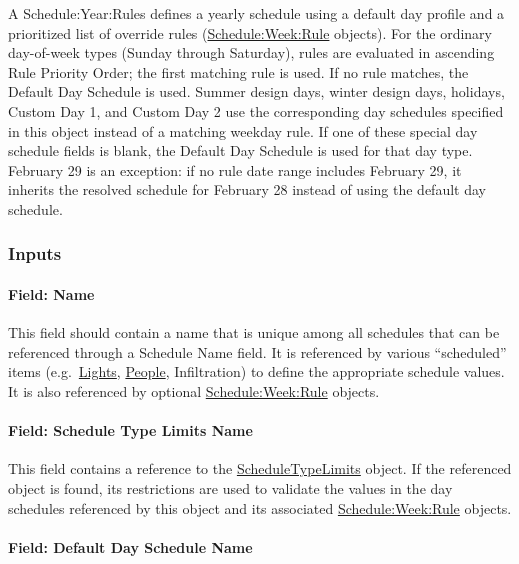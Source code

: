 A Schedule:Year:Rules defines a yearly schedule using a default day profile and a prioritized list of override rules (\hyperref[scheduleweekrule]{Schedule:Week:Rule} objects).
For the ordinary day-of-week types (Sunday through Saturday), rules are evaluated in ascending Rule Priority Order; the first matching rule is used.
If no rule matches, the Default Day Schedule is used.
Summer design days, winter design days, holidays, Custom Day 1, and Custom Day 2 use the corresponding day schedules specified in this object instead of a matching weekday rule.
If one of these special day schedule fields is blank, the Default Day Schedule is used for that day type.
February 29 is an exception: if no rule date range includes February 29, it inherits the resolved schedule for February 28 instead of using the default day schedule.

\subsubsection{Inputs}\label{inputs-scheduleyearrules}

\paragraph{Field: Name}\label{field-name-scheduleyearrules}

This field should contain a name that is unique among all schedules that can be referenced through a Schedule Name field.
It is referenced by various ``scheduled'' items (e.g.~\hyperref[lights-000]{Lights}, \hyperref[people]{People}, Infiltration) to define the appropriate schedule values.
It is also referenced by optional \hyperref[scheduleweekrule]{Schedule:Week:Rule} objects.

\paragraph{Field: Schedule Type Limits Name}\label{field-schedule-type-limits-name-scheduleyearrules}

This field contains a reference to the \hyperref[scheduletypelimits]{ScheduleTypeLimits} object.
If the referenced object is found, its restrictions are used to validate the values in the day schedules referenced by this object and its associated \hyperref[scheduleweekrule]{Schedule:Week:Rule} objects.

\paragraph{Field: Default Day Schedule Name}\label{field-default-day-schedule-name-scheduleyearrules}


